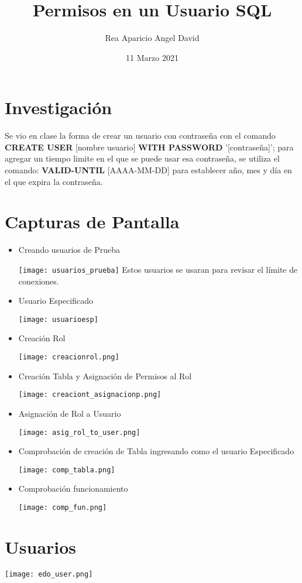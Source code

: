 \documentclass[letterpaper]{article}
\title{Permisos en un Usuario SQL}
\author{Rea Aparicio Angel David}
\date{11 Marzo 2021}
\begin{document}
\maketitle

\section{Investigación}
Se vio en clase la forma de crear un usuario con contraseña con el comando \textbf{CREATE USER} [nombre usuario] \textbf{WITH PASSWORD} '[contraseña]'; para agregar un tiempo limite en el que se puede usar esa contraseña, se utiliza el comando: \textbf{VALID-UNTIL} [AAAA-MM-DD] para establecer año, mes y día en el que expira la contraseña.
\section{Capturas de Pantalla}
\begin{itemize}
    \item Creando usuarios de Prueba\par
    \texttt{[image: usuarios\_prueba]} 
    Estos usuarios se usaran para revisar el límite de conexiones.
    \item Usuario Especificado \par 
    \texttt{[image: usuarioesp]} 
    \item Creación Rol \par
    \texttt{[image: creacionrol.png]}
    \item Creación Tabla y Asignación de Permisos al Rol \par 
    \texttt{[image: creaciont\_asignacionp.png]}
    \item Asignación de Rol a Usuario \par
    \texttt{[image: asig\_rol\_to\_user.png]}
    \item Comprobación de creación de Tabla ingresando como el usuario Especificado \par
    \texttt{[image: comp\_tabla.png]}
    \item Comprobación funcionamiento \par
    \texttt{[image: comp\_fun.png]}
\end{itemize}
\section{Usuarios} \par
\texttt{[image: edo\_user.png]}\par
\end{document}
